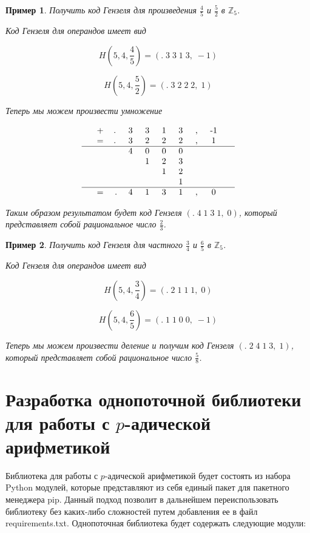 \documentclass[master, och, diploma, times]{sty/SCWorks}
\theoremstyle{plain}
\newtheorem{exmp}{Пример}[section]
\theoremstyle{definition}
\begin{document}
\begin{exmp}
Получить код Гензеля для произведения $\frac{4}{5}$ и $\frac{5}{2}$ в $\mathbb{Z}_5$.

\noindent Код Гензеля для операндов имеет вид

$$H(5,4, \frac{4}{5})=(.\; 3\; 3\; 1\; 3,\; -1)$$

$$H(5,4, \frac{5}{2})=(.\; 3\; 2\; 2\; 2,\; 1)$$

\noindent Теперь мы можем произвести умножение

$$
\begin{tabular}{cccccccccc}
& + & .\; & 3\; & 3\; & 1\; & 3\; & ,\; & -1\; \\
& = & .\; & 3\; & 2\; & 2\; & 2\; & ,\; & 1\; \\
\hline
& & & 4\; & 0\; & 0\; & 0\; & & & \\
& & & & 1\; & 2\; & 3\; & & & \\
& & & & & 1\; & 2\; & & & \\
& & & & & & 1\; & & & \\
\hline
& = & . & 4\; & 1\; & 3\; & 1\; & ,\; & 0\; &
\end{tabular}
$$


\noindent Таким образом результатом будет код Гензеля $(.\; 4\; 1\; 3\; 1,\; 0)$, который представляет собой рациональное число $\frac{2}{3}$.
\end{exmp}



\begin{exmp}
Получить код Гензеля для частного $\frac{3}{4}$ и $\frac{6}{5}$ в $\mathbb{Z}_5$.

\noindent Код Гензеля для операндов имеет вид

$$H(5,4, \frac{3}{4})=(.\; 2\; 1\; 1\; 1,\; 0)$$

$$H(5,4, \frac{6}{5})=(.\; 1\; 1\; 0\; 0,\; -1)$$

\noindent Теперь мы можем произвести деление и получим код Гензеля $(.\; 2\; 4\; 1\; 3,\; 1)$, который представляет собой рациональное число $\frac{5}{8}$.
\end{exmp}


\section{Разработка однопоточной библиотеки для работы с $p$-адической арифметикой}

Библиотека для работы с $p$-адической арифметикой будет состоять из набора Python модулей, которые представляют из себя единый пакет для пакетного менеджера pip. Данный подход позволит в дальнейшем переиспользовать библиотеку без каких-либо сложностей путем добавления ее в файл requirements.txt. Однопоточная библиотека будет содержать следующие модули:
\end{document}
